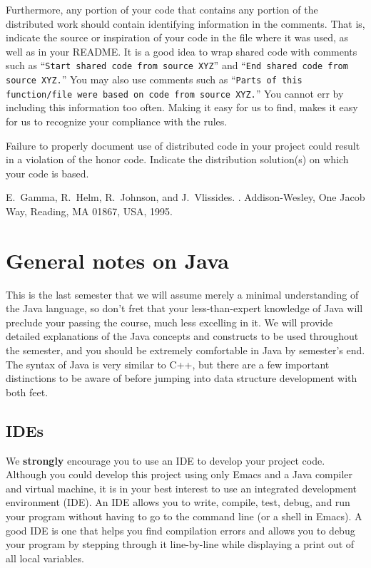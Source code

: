 \documentclass[12pt]{article}
\begin{document}
Furthermore, any portion of your code that contains any portion of the
distributed work should contain identifying information in the
comments.  That is, indicate the  source or inspiration of  your code 
 in the file where it was used, as well as in your README\@.   It is a good idea to wrap shared
code with comments such as ``\texttt{Start shared code from source
  XYZ}'' and ``\texttt{End shared code from source XYZ.}'' You may
also use comments such as ``\texttt{Parts of this function/file were
  based on code from source XYZ.}''  You cannot err by including this
information too often. Making it easy for us to find, makes it easy
for us to recognize your compliance with the  rules.

Failure to properly document use of distributed code in your project
could result in a violation of the honor code.  Indicate the
distribution solution(s) on which your code is based.

\begin{thebibliography}{99}

E.~Gamma, R.~Helm, R.~Johnson, and J.~Vlissides.
.
\newblock Addison-Wesley, One Jacob Way, Reading, MA 01867, USA, 1995.

\end{thebibliography}



\appendix
\section{General notes on Java}

This is the last semester that
we will  assume merely a minimal understanding of the Java language, so
don't fret that your less-than-expert knowledge of Java will preclude
your passing the course, much less excelling in it.  We will provide
detailed explanations of the Java concepts and constructs to be used
throughout the semester, and you should be extremely comfortable in
Java by semester's end.  The syntax of Java is very similar to C++,
but there are a few important distinctions to be aware of before
jumping into data structure development with both feet.

\subsection{IDEs}

We \textbf{strongly} encourage you to use an IDE to develop your
project code.  Although you could develop this project using only
Emacs and a Java compiler and virtual machine, it is in your best
interest to use an integrated development environment (IDE).  An IDE
allows you to write, compile, test, debug, and run your program
without having to go to the command line (or a shell in Emacs).  A
good IDE is one that helps you find compilation errors and allows you
to debug your program by stepping through it line-by-line while
displaying a print out of all local variables.
\end{document}
